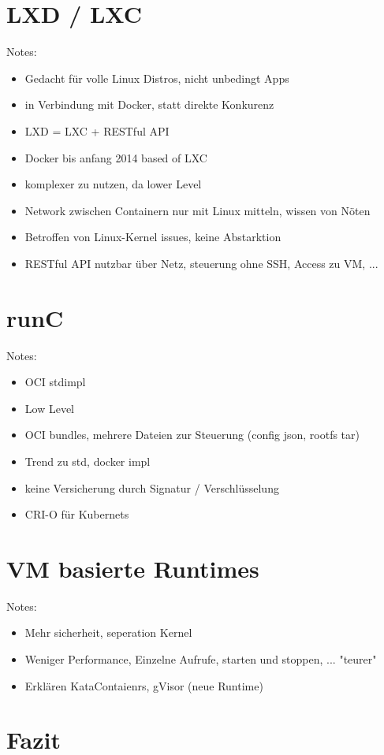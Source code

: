 \section{LXD / LXC}
\label{sec:compLXD}
Notes:
\begin{itemize}
	\item Gedacht für volle Linux Distros, nicht unbedingt Apps
	\item in Verbindung mit Docker, statt direkte Konkurenz
	\item LXD = LXC + RESTful API
	\item Docker bis anfang 2014 based of LXC
	\item komplexer zu nutzen, da lower Level
	\item Network zwischen Containern nur mit Linux mitteln, wissen von Nöten
	\item Betroffen von Linux-Kernel issues, keine Abstarktion
	\item RESTful API nutzbar über Netz, steuerung ohne SSH, Access zu VM, ...
\end{itemize}

\section{runC}
\label{sec:compRunc}

Notes:
\begin{itemize}
	\item OCI stdimpl
	\item Low Level
	\item OCI bundles, mehrere Dateien zur Steuerung (config json, rootfs tar)
	\item Trend zu std, docker impl
	\item keine Versicherung durch Signatur / Verschlüsselung
	\item CRI-O für Kubernets
\end{itemize}

\section{VM basierte Runtimes}
\label{sec:compVMbased}

Notes:
\begin{itemize}
	\item Mehr sicherheit, seperation Kernel
	\item Weniger Performance, Einzelne Aufrufe, starten und stoppen, ... "teurer" 
	\item Erklären KataContaienrs, gVisor (neue Runtime)
\end{itemize}

\section{Fazit}
\label{sec:compFazit}